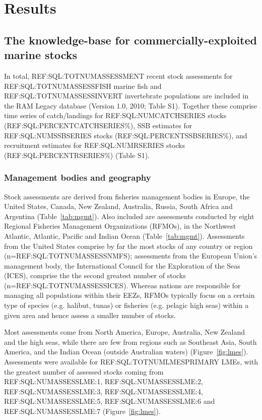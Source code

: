 \newpage
\section*{Results}
\subsection*{The knowledge-base for commercially-exploited marine stocks}
In total, REF:SQL:TOTNUMASSESSMENT recent stock assessments for
REF:SQL:TOTNUMASSESSFISH marine fish and REF:SQL:TOTNUMASSESSINVERT
invertebrate populations are included in the RAM Legacy database
(Version 1.0, 2010; Table S1). Together these comprise time series of
catch/landings for REF:SQL:NUMCATCHSERIES stocks (REF:SQL:PERCENTCATCHSERIES\%),
SSB estimates for REF:SQL:NUMSSBSERIES stocks (REF:SQL:PERCENTSSBSERIES\%), and recruitment estimates for
REF:SQL:NUMRSERIES stocks (REF:SQL:PERCENTRSERIES\%) (Table S1).

\subsubsection*{Management bodies and geography}
Stock assessments are derived from fisheries management bodies in
Europe, the United States, Canada, New Zealand, Australia, Russia,
South Africa and Argentina (Table~\ref{tab:mgmt}). Also included are
assessments conducted by eight Regional Fisheries Management
Organizations (RFMOs), in the Northwest Atlantic, Atlantic, Pacific
and Indian Ocean (Table~\ref{tab:mgmt}). Assessments from the United
States comprise by far the most stocks of any country or region
(n=REF:SQL:TOTNUMASSESSNMFS); assessments from the European Union's
management body, the International Council for the Exploration of the
Seas (ICES), comprise the the second greatest number of stocks
(n=REF:SQL:TOTNUMASSESSICES).  Whereas nations are responsible for
managing all populations within their EEZs, RFMOs typically focus on a
certain type of species (e.g.  halibut, tunas) or fisheries (e.g.
pelagic high seas) within a given area and hence assess a smaller
number of stocks.

Most assessments come from North America, Europe, Australia, New
Zealand and the high seas, while there are few from regions such as
Southeast Asia, South America, and the Indian Ocean (outside
Australian waters) (Figure~\ref{fig:lmes}). Assessments were available for REF:SQL:TOTNUMLMESPRIMARY LMEs, with the greatest number of
assessed stocks coming from REF:SQL:NUMASSESSLME:1,
REF:SQL:NUMASSESSLME:2, REF:SQL:NUMASSESSLME:3,
REF:SQL:NUMASSESSLME:4, REF:SQL:NUMASSESSLME:5, REF:SQL:NUMASSESSLME:6
and REF:SQL:NUMASSESSLME:7 (Figure~\ref{fig:lmes}).

